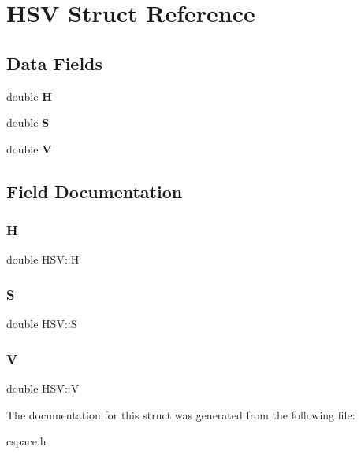 \hypertarget{struct_h_s_v}{}\section{H\+SV Struct Reference}
\label{struct_h_s_v}
\subsection*{Data Fields}
\begin{DoxyCompactItemize}
\item 
\mbox{\label{struct_h_s_v_aa5298b83b6f6ad2da2f2921c3e3202e7}} 
double {\bfseries H}
\item 
\mbox{\label{struct_h_s_v_a246df45210c6b7c61056158d1596676d}} 
double {\bfseries S}
\item 
\mbox{\label{struct_h_s_v_aade636e6ce581e93de5374f0e5d77d7c}} 
double {\bfseries V}
\end{DoxyCompactItemize}


\subsection{Field Documentation}
\mbox{\label{struct_h_s_v_aa5298b83b6f6ad2da2f2921c3e3202e7}} 
\subsubsection{\texorpdfstring{H}{H}}
{\footnotesize\ttfamily double H\+S\+V\+::H}

\mbox{\label{struct_h_s_v_a246df45210c6b7c61056158d1596676d}} 
\subsubsection{\texorpdfstring{S}{S}}
{\footnotesize\ttfamily double H\+S\+V\+::S}

\mbox{\label{struct_h_s_v_aade636e6ce581e93de5374f0e5d77d7c}} 
\subsubsection{\texorpdfstring{V}{V}}
{\footnotesize\ttfamily double H\+S\+V\+::V}



The documentation for this struct was generated from the following file\+:\begin{DoxyCompactItemize}
\item 
cspace.\+h\end{DoxyCompactItemize}
